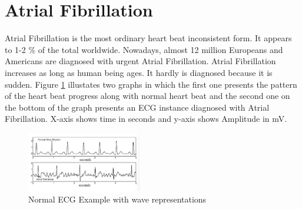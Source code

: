 \documentclass[review]{elsarticle}
\begin{document}
%

\section{Atrial Fibrillation}
Atrial Fibrillation is the most ordinary heart beat inconsistent form. It appears to 1-2 \% of the total worldwide. Nowadays, almost 12 million Europeans and Americans are diagnosed with urgent Atrial Fibrillation. Atrial Fibrillation increases as long as human being ages. It hardly is diagnosed because it is sudden. Figure \ref{fig:ExampleAtrialFibrillationandNormalOne} illustates two graphs in which the first one presents the pattern of the heart beat progress along with normal heart beat and the second one on the bottom of the graph presents an ECG instance diagnosed with Atrial Fibrillation. X-axis shows time in seconds and y-axis shows Amplitude in mV.

\begin{figure}[h!]
	\includegraphics[width=50mm,scale=0.5]{./Figures/ExampleAtrialFibrillationandNormalOne.png}
	\centering
	\caption{Normal ECG Example with wave representations}
	\label{fig:ExampleAtrialFibrillationandNormalOne}
\end{figure}
\end{document}
